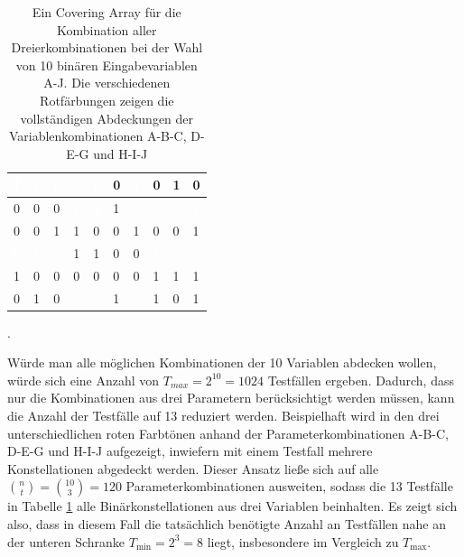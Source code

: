 \begin{table}[h]
\begin{tabular}{|l|l|l|l|l|l|l|l|l|l|}
\cellcolor{red1}\textcolor{white}{1} & \cellcolor{red1}\textcolor{white}{1} & \cellcolor{red1}\textcolor{white}{0} & \cellcolor{red2}\textcolor{white}{1} & \cellcolor{red2}\textcolor{white}{0} & 0 & \cellcolor{red2}\textcolor{white}{1} & 0 & 1 & 0 \\ \hline
0 & 0 & 0 & \cellcolor{red2}\textcolor{white}{1} & \cellcolor{red2}\textcolor{white}{1} & 1 & \cellcolor{red2}\textcolor{white}{0} & \cellcolor{red3}\textcolor{white}{0} & \cellcolor{red3}\textcolor{white}{1} & \cellcolor{red3}\textcolor{white}{1} \\ \hline
0 & 0 & 1 & 1 & 0 & 0 & 1 & 0 & 0 & 1 \\ \hline
\cellcolor{red1}\textcolor{white}{0} & \cellcolor{red1}\textcolor{white}{1} & \cellcolor{red1}\textcolor{white}{0} & 1 & 1 & 0 & 0 & \cellcolor{red3}\textcolor{white}{1} & \cellcolor{red3}\textcolor{white}{0} & \cellcolor{red3}\textcolor{white}{0} \\ \hline
1 & 0 & 0 & 0 & 0 & 0 & 0 & 1 & 1 & 1 \\ \hline
0 & 1 & 0 & \cellcolor{red2}\textcolor{white}{0} & \cellcolor{red2}\textcolor{white}{0} & 1 & \cellcolor{red2}\textcolor{white}{1} & 1 & 0 & 1 \\ \hline
\end{tabular}
\caption{Ein Covering Array für die Kombination aller Dreierkombinationen bei der Wahl von 10 binären Eingabevariablen A-J. Die verschiedenen Rotfärbungen zeigen die vollständigen Abdeckungen der Variablenkombinationen A-B-C, D-E-G und H-I-J \cite{kuhn2010practical}}.
\label{tab:3wayInteraction}
\end{table}

Würde man alle möglichen Kombinationen der 10 Variablen abdecken wollen, würde sich eine Anzahl von $T_{max} = 2^{10} = 1024$ Testfällen ergeben. Dadurch, dass nur die Kombinationen aus drei Parametern berücksichtigt werden müssen, kann die Anzahl der Testfälle auf 13 reduziert werden. Beispielhaft wird in den drei unterschiedlichen roten Farbtönen anhand der Parameterkombinationen A-B-C, D-E-G und H-I-J aufgezeigt, inwiefern mit einem Testfall mehrere Konstellationen abgedeckt werden. Dieser Ansatz ließe sich auf alle $\binom{n}{t} = \binom{10}{3} = 120$ Parameterkombinationen ausweiten, sodass die 13 Testfälle in Tabelle \ref{tab:3wayInteraction} alle Binärkonstellationen aus drei Variablen beinhalten. Es zeigt sich also, dass in diesem Fall die tatsächlich benötigte Anzahl an Testfällen nahe an der unteren Schranke $T_{\min} = 2^3 = 8$ liegt, insbesondere im Vergleich zu $T_{\max}$.

